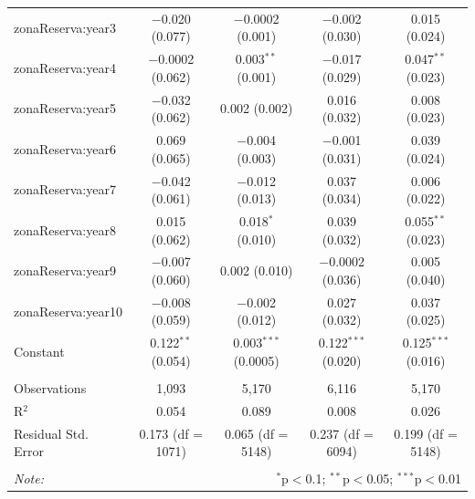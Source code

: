 \documentclass[utf8]{frontiers_suppmat} %
\begin{document}
\begin{table}[!htbp]
\begin{tabular}{@{\extracolsep{1pt}}lcccc}
  zonaReserva:year3 & $-$0.020 (0.077) & $-$0.0002 (0.001) & $-$0.002 (0.030) & 0.015 (0.024) \\ 
  zonaReserva:year4 & $-$0.0002 (0.062) & 0.003$^{**}$ (0.001) & $-$0.017 (0.029) & 0.047$^{**}$ (0.023) \\ 
  zonaReserva:year5 & $-$0.032 (0.062) & 0.002 (0.002) & 0.016 (0.032) & 0.008 (0.023) \\ 
  zonaReserva:year6 & 0.069 (0.065) & $-$0.004 (0.003) & $-$0.001 (0.031) & 0.039 (0.024) \\ 
  zonaReserva:year7 & $-$0.042 (0.061) & $-$0.012 (0.013) & 0.037 (0.034) & 0.006 (0.022) \\ 
  zonaReserva:year8 & 0.015 (0.062) & 0.018$^{*}$ (0.010) & 0.039 (0.032) & 0.055$^{**}$ (0.023) \\ 
  zonaReserva:year9 & $-$0.007 (0.060) & 0.002 (0.010) & $-$0.0002 (0.036) & 0.005 (0.040) \\ 
  zonaReserva:year10 & $-$0.008 (0.059) & $-$0.002 (0.012) & 0.027 (0.032) & 0.037 (0.025) \\ 
  Constant & 0.122$^{**}$ (0.054) & 0.003$^{***}$ (0.0005) & 0.122$^{***}$ (0.020) & 0.125$^{***}$ (0.016) \\ 
 \hline \\[-1.8ex] 
Observations & 1,093 & 5,170 & 6,116 & 5,170 \\ 
R$^{2}$ & 0.054 & 0.089 & 0.008 & 0.026 \\ 
Residual Std. Error & 0.173 (df = 1071) & 0.065 (df = 5148) & 0.237 (df = 6094) & 0.199 (df = 5148) \\ 
\hline 
\hline \\[-1.8ex] 
\textit{Note:}  & \multicolumn{4}{r}{$^{*}$p$<$0.1; $^{**}$p$<$0.05; $^{***}$p$<$0.01} \\ 
\end{tabular} 
\end{table}

\clearpage
\end{document}
